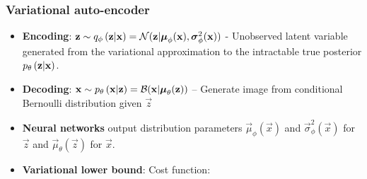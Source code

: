 \subsubsection{Variational auto-encoder}
\label{ssub:vae}

\begin{itemize}
	\item \textbf{Encoding}: $\bm{\mathrm{z}} \sim q_{\phi}\left(\bm{\mathrm{z}}|\bm{\mathrm{x}}\right)=\mathcal{N}( \bm{\mathrm{z}}|\bm{\mathrm{\mu}}_\phi(\bm{\mathrm{x}}),\bm{\mathrm{\sigma}}^2_\phi(\bm{\mathrm{x}}))$ - Unobserved latent variable generated from the variational approximation to the intractable true posterior $p_{\theta}\left(\bm{\mathrm{z}}|\bm{\mathrm{x}}\right)$.
	\item \textbf{Decoding}: $\bm{\mathrm{x}} \sim p_{\theta}\left(\bm{\mathrm{x}}|\bm{\mathrm{z}}\right)=\mathcal{B}( \bm{\mathrm{x}}|\bm{\mathrm{\mu}}_\theta(\bm{\mathrm{z}}))$ -- Generate image from conditional Bernoulli distribution given $\vec{z}$
	\item \textbf{Neural networks} output distribution parameters $\vec{\mu}_\phi(\vec{x})$ and $\vec{\sigma}^2_\phi(\vec{x})$ for $\vec{z}$ and $\vec{\mu}_\theta(\vec{z})$ for $\vec{x}$.
	\item \textbf{Variational lower bound}: Cost function: 

\end{itemize}
